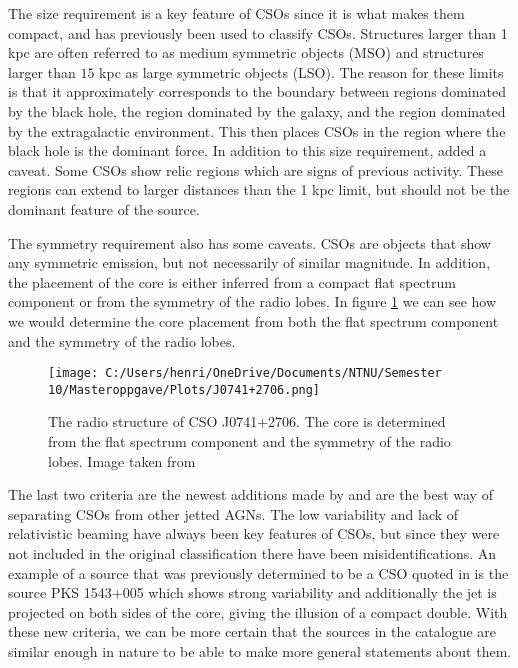 The size requirement is a key feature of CSOs since it is what makes them compact, and has previously been used to classify CSOs. Structures larger than 1 kpc are often referred to as medium symmetric objects (MSO) and structures larger than $15$ kpc as large symmetric objects (LSO). The reason for these limits is that it approximately corresponds to the boundary between regions dominated by the black hole, the region dominated by the galaxy, and the region dominated by the extragalactic environment. This then places CSOs in the region where the black hole is the dominant force. In addition to this size requirement, \cite{kiehlmann2023compact} added a caveat. Some CSOs show relic regions which are signs of previous activity. These regions can extend to larger distances than the 1 kpc limit, but should not be the dominant feature of the source.

The symmetry requirement also has some caveats. CSOs are objects that show any symmetric emission, but not necessarily of similar magnitude. In addition, the placement of the core is either inferred from a compact flat spectrum component or from the symmetry of the radio lobes. In figure \ref{fig:CSO_J0741} we can see how we would determine the core placement from both the flat spectrum component and the symmetry of the radio lobes.

\begin{figure}
    \centering
    \texttt{[image: C:/Users/henri/OneDrive/Documents/NTNU/Semester 10/Masteroppgave/Plots/J0741+2706.png]}
    \caption{The radio structure of CSO J0741+2706. The core is determined from the flat spectrum component and the symmetry of the radio lobes. Image taken from \cite{Tremblay_2016}}
    \label{fig:CSO_J0741}
\end{figure}

The last two criteria are the newest additions made by \cite{kiehlmann2023compact} and are the best way of separating CSOs from other jetted AGNs. The low variability and lack of relativistic beaming have always been key features of CSOs, but since they were not included in the original classification there have been misidentifications. An example of a source that was previously determined to be a CSO quoted in \cite{kiehlmann2023compact} is the source PKS 1543+005 which shows strong variability and additionally the jet is projected on both sides of the core, giving the illusion of a compact double. With these new criteria, we can be more certain that the sources in the catalogue are similar enough in nature to be able to make more general statements about them.






